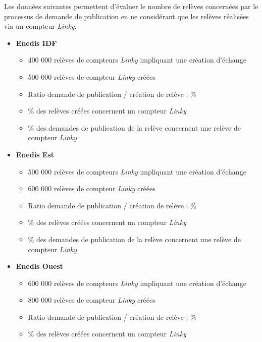 \documentclass[a4paper, 12pt]{report}
\begin{document}
Les données suivantes permettent d'évaluer le nombre de relèves concernées par le processus de demande de publication en ne considérant que les relèves réalisées via un compteur \textit{\textit{Linky}}.\\

\begin{itemize}
  \item \textbf{Enedis IDF}
  \begin{itemize}
    \item \approx{} 400 000 relèves de compteurs \textit{\textit{Linky}} impliquant une création d'échange
    \item \approx{} 500 000 relèves de compteur \textit{\textit{Linky}} créées
    \item Ratio demande de publication / création de relève : \approx{}\%
    \item \approx{}\% des relèves créées concernent un compteur \textit{\textit{Linky}}
    \item \approx{}\% des demandes de publication de la relève concernent une relève de compteur \textit{\textit{Linky}}
  \end{itemize}
  \item \textbf{Enedis Est}
  \begin{itemize}
    \item \approx{} 500 000 relèves de compteurs \textit{Linky} impliquant une création d'échange
    \item \approx{} 600 000 relèves de compteur \textit{Linky} créées
    \item Ratio demande de publication / création de relève : \approx{}\%
    \item \approx{}\% des relèves créées concernent un compteur \textit{Linky}
    \item \approx{}\% des demandes de publication de la relève concernent une relève de compteur \textit{Linky}
  \end{itemize}
  \item \textbf{Enedis Ouest}
  \begin{itemize}
    \item \approx{} 600 000 relèves de compteurs \textit{Linky} impliquant une création d'échange
    \item \approx{} 800 000 relèves de compteur \textit{Linky} créées
    \item Ratio demande de publication / création de relève : \approx{}\%
    \item \approx{}\% des relèves créées concernent un compteur \textit{Linky}

\end{itemize}
\end{itemize}
\end{document}
